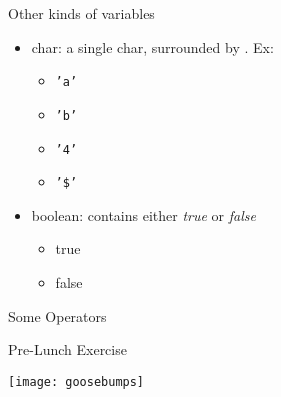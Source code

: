 \begin{frame}{Other kinds of variables}
\begin{itemize}
\item char: a single char, surrounded by . Ex:
\begin{itemize}
\item \texttt{'a'}
\item \texttt{'b'}
\item \texttt{'4'}
\item \texttt{'\$'}
\end{itemize} \pause
\item boolean: contains either \emph{true} or \emph{false}
\begin{itemize}
\item true
\item false
\end{itemize}
\end{itemize}
\end{frame}

\begin{frame}[fragile]{Some Operators}
\begin{semiverbatim}\end{semiverbatim}
\end{frame}


\begin{frame}{Pre-Lunch Exercise}
\begin{center}
\texttt{[image: goosebumps]}
\end{center}
\end{frame}
